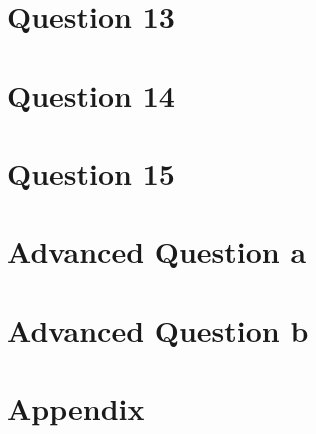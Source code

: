 \documentclass[10pt]{article}
\begin{document}
\section*{Question 13}

\section*{Question 14}

\section*{Question 15}

\section*{Advanced Question a}

\section*{Advanced Question b}

\section*{Appendix}
\end{document}
